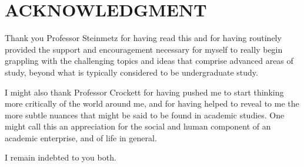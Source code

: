 \documentclass[letterpaper, 10 pt, conference]{ieeeconf}
\begin{document}

\section*{ACKNOWLEDGMENT}
Thank you Professor Steinmetz for having read this and for having routinely provided the support and encouragement necessary for myself to really begin grappling with the challenging topics and ideas that comprise advanced areas of study, beyond what is typically considered to be undergraduate study.

I might also thank Professor Crockett for having pushed me to start thinking more critically of the world around me, and for having helped to reveal to me the more subtle nuances that might be said to be found in academic studies. One might call this an appreciation for the social and human component of an academic enterprise, and of life in general.

I remain indebted to you both.

\end{document}
